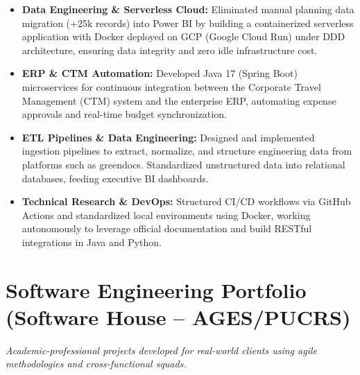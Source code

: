 \documentclass[10pt, letterpaper]{article}
\begin{document}
\begin{itemize}
    \item \textbf{Data Engineering \& Serverless Cloud:} Eliminated manual planning data migration (+25k records) into Power BI by building a containerized serverless application with Docker deployed on GCP (Google Cloud Run) under DDD architecture, ensuring data integrity and zero idle infrastructure cost.

    \item \textbf{ERP \& CTM Automation:} Developed Java 17 (Spring Boot) microservices for continuous integration between the Corporate Travel Management (CTM) system and the enterprise ERP, automating expense approvals and real-time budget synchronization.

    \item \textbf{ETL Pipelines \& Data Engineering:} Designed and implemented ingestion pipelines to extract, normalize, and structure engineering data from platforms such as greendocs. Standardized unstructured data into relational databases, feeding executive BI dashboards.

    \item \textbf{Technical Research \& DevOps:} Structured CI/CD workflows via GitHub Actions and standardized local environments using Docker, working autonomously to leverage official documentation and build RESTful integrations in Java and Python.
\end{itemize}

\section*{Software Engineering Portfolio (Software House -- AGES/PUCRS)}
\textit{\small Academic-professional projects developed for real-world clients using agile methodologies and cross-functional squads.}
\vspace{0.3em}
\end{document}
